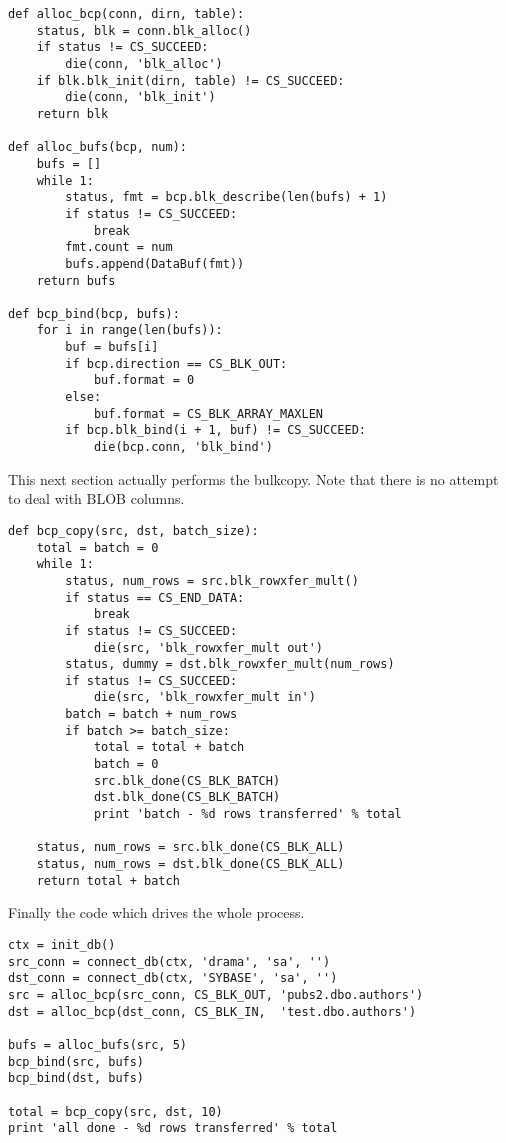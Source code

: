 \begin{verbatim}
def alloc_bcp(conn, dirn, table):
    status, blk = conn.blk_alloc()
    if status != CS_SUCCEED:
        die(conn, 'blk_alloc')
    if blk.blk_init(dirn, table) != CS_SUCCEED:
        die(conn, 'blk_init')
    return blk

def alloc_bufs(bcp, num):
    bufs = []
    while 1:
        status, fmt = bcp.blk_describe(len(bufs) + 1)
        if status != CS_SUCCEED:
            break
        fmt.count = num
        bufs.append(DataBuf(fmt))
    return bufs

def bcp_bind(bcp, bufs):
    for i in range(len(bufs)):
        buf = bufs[i]
        if bcp.direction == CS_BLK_OUT:
            buf.format = 0
        else:
            buf.format = CS_BLK_ARRAY_MAXLEN
        if bcp.blk_bind(i + 1, buf) != CS_SUCCEED:
            die(bcp.conn, 'blk_bind')
\end{verbatim}

This next section actually performs the bulkcopy.  Note that there is
no attempt to deal with BLOB columns.

\begin{verbatim}
def bcp_copy(src, dst, batch_size):
    total = batch = 0
    while 1:
        status, num_rows = src.blk_rowxfer_mult()
        if status == CS_END_DATA:
            break
        if status != CS_SUCCEED:
            die(src, 'blk_rowxfer_mult out')
        status, dummy = dst.blk_rowxfer_mult(num_rows)
        if status != CS_SUCCEED:
            die(src, 'blk_rowxfer_mult in')
        batch = batch + num_rows
        if batch >= batch_size:
            total = total + batch
            batch = 0
            src.blk_done(CS_BLK_BATCH)
            dst.blk_done(CS_BLK_BATCH)
            print 'batch - %d rows transferred' % total

    status, num_rows = src.blk_done(CS_BLK_ALL)
    status, num_rows = dst.blk_done(CS_BLK_ALL)
    return total + batch
\end{verbatim}

Finally the code which drives the whole process.

\begin{verbatim}
ctx = init_db()
src_conn = connect_db(ctx, 'drama', 'sa', '')
dst_conn = connect_db(ctx, 'SYBASE', 'sa', '')
src = alloc_bcp(src_conn, CS_BLK_OUT, 'pubs2.dbo.authors')
dst = alloc_bcp(dst_conn, CS_BLK_IN,  'test.dbo.authors')

bufs = alloc_bufs(src, 5)
bcp_bind(src, bufs)
bcp_bind(dst, bufs)

total = bcp_copy(src, dst, 10)
print 'all done - %d rows transferred' % total
\end{verbatim}
